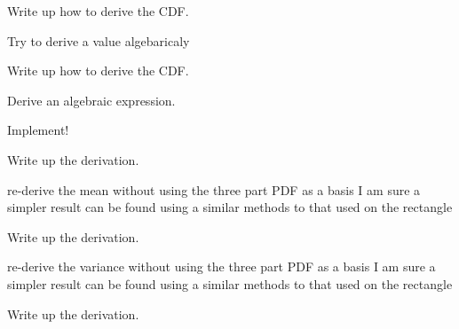 
\begin{DoxyRefList}
\item[\label{todo__todo000001}%
\hypertarget{todo__todo000001}{}%
Global \hyperlink{_cube_8h_aa32dd25cda8601c7f6af2dbd096dc58c}{Cube\-Distance\-C\-D\-F} (double a, double $\ast$b)]Write up how to derive the C\-D\-F.  
\item[\label{todo__todo000002}%
\hypertarget{todo__todo000002}{}%
Global \hyperlink{_cube_8h_ac37d5ff3c99d8637fc414212ac041f18}{Cube\-Distance\-Var} (double $\ast$parameters)]Try to derive a value algebaricaly  
\item[\label{todo__todo000003}%
\hypertarget{todo__todo000003}{}%
Global \hyperlink{_disk_8h_a8958adae00c0c55d68c1e81deb51c06b}{Disk\-Distance\-C\-D\-F} (double a, double $\ast$b)]Write up how to derive the C\-D\-F.  
\item[\label{todo__todo000004}%
\hypertarget{todo__todo000004}{}%
Global \hyperlink{_disk_8h_a156ab336770f189207572a9282158392}{Disk\-Distance\-Var} (double $\ast$parameters)]Derive an algebraic expression.  
\item[\label{todo__todo000005}%
\hypertarget{todo__todo000005}{}%
Global \hyperlink{_hyperball_8h_a911b77b473d55872774163ed724af6f3}{Hyperball\-Distance\-C\-D\-F} (double t, double $\ast$parameters)]Implement!  
\item[\label{todo__todo000007}%
\hypertarget{todo__todo000007}{}%
Global \hyperlink{_prism_geodesic_8h_a8fb219075b27e66757a3b5c234097c4d}{Prism\-Geodesic\-Distance\-C\-D\-F} (double t, double $\ast$parameters)]Write up the derivation.  
\item[\label{todo__todo000008}%
\hypertarget{todo__todo000008}{}%
Global \hyperlink{_prism_geodesic_8h_a8ac24433806e383dec481431b92b4606}{Prism\-Geodesic\-Distance\-Mean} (double $\ast$parameters)]re-\/derive the mean without using the three part P\-D\-F as a basis I am sure a simpler result can be found using a similar methods to that used on the rectangle  
\item[\label{todo__todo000006}%
\hypertarget{todo__todo000006}{}%
Global \hyperlink{_prism_geodesic_8h_a674a98341a80a5b8589352280f89173c}{Prism\-Geodesic\-Distance\-P\-D\-F} (double t, double $\ast$parameters)]Write up the derivation.  
\item[\label{todo__todo000009}%
\hypertarget{todo__todo000009}{}%
Global \hyperlink{_prism_geodesic_8h_ac804282eeada51c4b8b2e2ae636d1bab}{Prism\-Geodesic\-Distance\-Var} (double $\ast$parameters)]re-\/derive the variance without using the three part P\-D\-F as a basis I am sure a simpler result can be found using a similar methods to that used on the rectangle  
\item[\label{todo__todo000010}%
\hypertarget{todo__todo000010}{}%
Global \hyperlink{_rectangle_8h_a1efe7711b068562816ebbe0af282f20b}{Rectangle\-Distance\-C\-D\-F} (double t, double $\ast$parameters)]Write up the derivation. 
\end{DoxyRefList}